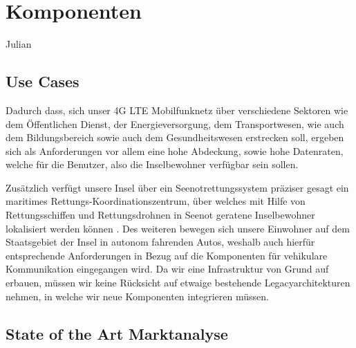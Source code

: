 
%
%
% 
% 
% 


\section{Komponenten}
\label{sec:Komponenten}
	Julian
	\subsection{Use Cases}
	\label{subsec:Use Cases}
	
	Dadurch dass, sich unser 4G LTE Mobilfunknetz über verschiedene Sektoren wie dem Öffentlichen Dienst, der Energieversorgung, dem Transportwesen, wie auch dem Bildungsbereich\cite{Tch18} sowie auch dem Gesundheitswesen erstrecken soll, ergeben sich als Anforderungen vor allem eine hohe Abdeckung, sowie hohe Datenraten, welche für die Benutzer, also die Inselbewohner verfügbar sein sollen. 
	
	Zusätzlich verfügt unsere Insel über ein Seenotrettungssystem präziser gesagt ein maritimes Rettungs-Koordinationszentrum, über welches mit Hilfe von Rettungsschiffen und Rettungsdrohnen in Seenot geratene Inselbewohner lokalisiert werden können \cite{eckermann2018tinylte}. Des weiteren bewegen sich unsere Einwohner auf dem Staatsgebiet der Insel in autonom fahrenden Autos, weshalb auch hierfür entsprechende Anforderungen in Bezug auf die Komponenten für vehikulare Kommunikation eingegangen wird. Da wir eine Infrastruktur von Grund auf erbauen, müssen wir keine Rücksicht auf etwaige bestehende Legacyarchitekturen nehmen, in welche wir neue Komponenten integrieren müssen. 
	\subsection{State of the Art Marktanalyse}
	\label{subsec:Marktanalyse}
	
